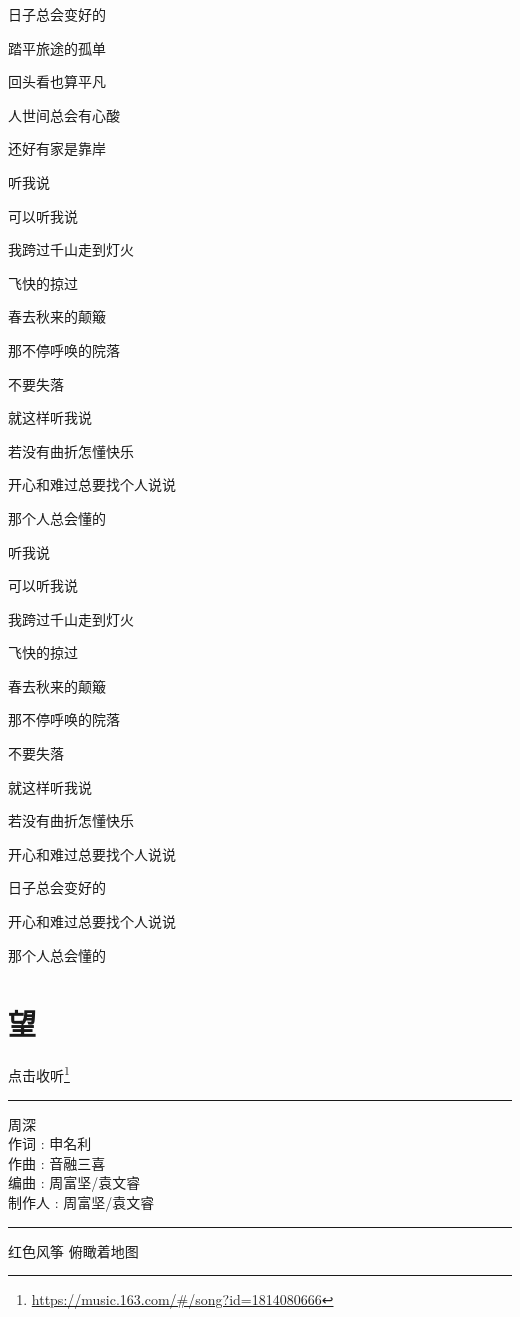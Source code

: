 \documentclass[]{ctexbook}
\renewcommand{\href}[2]{#2\footnote{\url{#1}}}
\begin{document}
日子总会变好的

踏平旅途的孤单

回头看也算平凡

人世间总会有心酸

还好有家是靠岸

听我说

可以听我说

我跨过千山走到灯火

飞快的掠过

春去秋来的颠簸

那不停呼唤的院落

不要失落

就这样听我说

若没有曲折怎懂快乐

开心和难过总要找个人说说

那个人总会懂的

听我说

可以听我说

我跨过千山走到灯火

飞快的掠过

春去秋来的颠簸

那不停呼唤的院落

不要失落

就这样听我说

若没有曲折怎懂快乐

开心和难过总要找个人说说

日子总会变好的

开心和难过总要找个人说说

那个人总会懂的

\section*{望}\label{Gaze}


\href{https://music.163.com/\#/song?id=1814080666}{点击收听}

\begin{center}\rule{0.5\linewidth}{0.5pt}\end{center}

周深\\
作词 : 申名利\\
作曲 : 音融三喜\\
编曲 : 周富坚/袁文睿\\
制作人 : 周富坚/袁文睿

\begin{center}\rule{0.5\linewidth}{0.5pt}\end{center}

红色风筝 俯瞰着地图
\end{document}
